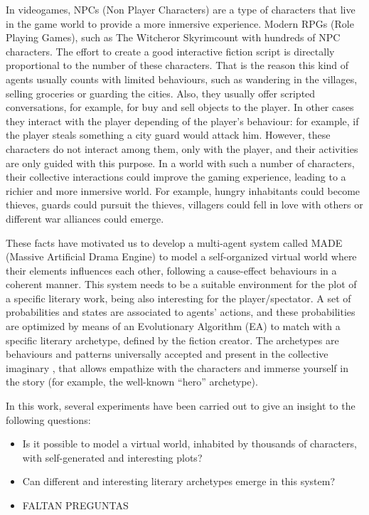 \documentclass[runningheads]{llncs}
\begin{document}
In videogames, NPCs (Non Player Characters) are a type of characters that live in the game world to provide a more inmersive experience. Modern RPGs (Role Playing Games), such as The Witcher\texttrademark or Skyrim\texttrademark count with hundreds of NPC characters. The effort to create a good interactive fiction script is directally proportional to the number of these characters. That is the reason this kind of agents usually counts with limited behaviours, such as wandering in the villages, selling groceries or guarding the cities. Also, they usually offer scripted conversations, for example, for buy and sell objects to the player. In other cases they interact with the player depending of the player's behaviour: for example, if the player steals something a city guard would attack him.  However, these characters do not interact among them, only with the player, and their activities are only guided with this purpose. In a world with such a number of characters, their collective interactions could improve the gaming experience, leading to a richier and more inmersive world. For example, hungry inhabitants could become thieves, guards could pursuit the thieves, villagers could fell in love with others or different war alliances could emerge.

These facts have motivated us to develop a multi-agent system called MADE (Massive Artificial Drama Engine) to model a self-organized virtual world where their elements influences each other, following a cause-effect behaviours in a coherent manner. This system needs to be a suitable environment for the plot of a specific literary work, being also interesting for the player/spectator. A set of probabilities and states are associated to agents' actions, and these probabilities are optimized by means of an Evolutionary Algorithm (EA) to match with a specific literary archetype, defined by the fiction creator. The archetypes are behaviours and patterns universally accepted and present in the collective imaginary \cite{ArchetypesGarry05}, that allows empathize with the characters and immerse yourself in the story (for example, the well-known ``hero'' archetype).

In this work, several experiments have been carried out to give an
insight to the following questions: %
\begin{itemize}
 \item Is it possible to model a virtual world, inhabited by thousands of characters, with self-generated and interesting plots?
 \item Can different and interesting literary archetypes emerge in this system?
 \item FALTAN PREGUNTAS
\end{itemize}
\end{document}
